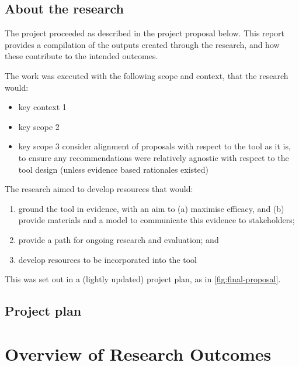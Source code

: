 \documentclass[
]{book}
\providecommand{\tightlist}{%
  \setlength{\itemsep}{0pt}\setlength{\parskip}{0pt}}
\begin{document}
\hypertarget{about-the-research}{%
\section{About the research}\label{about-the-research}}

The project proceeded as described in the project proposal below. This report provides a compilation of the outputs created through the research, and how these contribute to the intended outcomes.

The work was executed with the following scope and context, that the research would:

\begin{itemize}
\tightlist
\item
  key context 1
\item
  key scope 2
\item
  key scope 3 consider alignment of proposals with respect to the tool as it is, to ensure any recommendations were relatively agnostic with respect to the tool design (unless evidence based rationales existed)
\end{itemize}

The research aimed to develop resources that would:

\begin{enumerate}
\def\labelenumi{\arabic{enumi}.}
\tightlist
\item
  ground the tool in evidence, with an aim to (a) maximise efficacy, and (b) provide materials and a model to communicate this evidence to stakeholders;
\item
  provide a path for ongoing research and evaluation; and
\item
  develop resources to be incorporated into the tool
\end{enumerate}

This was set out in a (lightly updated) project plan, as in \ref{fig:final-proposal}.

\hypertarget{project-plan}{%
\section{Project plan}\label{project-plan}}

\label{fig:final-proposal}

\hypertarget{overview}{%
\chapter{Overview of Research Outcomes}\label{overview}}
\end{document}
